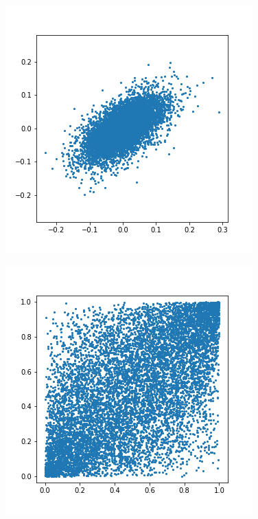 \documentclass{article}
\begin{document}
\begin{figure}[!ht]
    \begin{minipage}{.33\linewidth}
        \centering
        \includegraphics[width=\textwidth]{pics/copula1.png}
        \label{fig:copula1}
    \end{minipage}%
    \begin{minipage}{.33\linewidth}
        \centering
        \includegraphics[width=\textwidth]{pics/copula2.png}

\end{minipage}
\end{figure}
\end{document}
